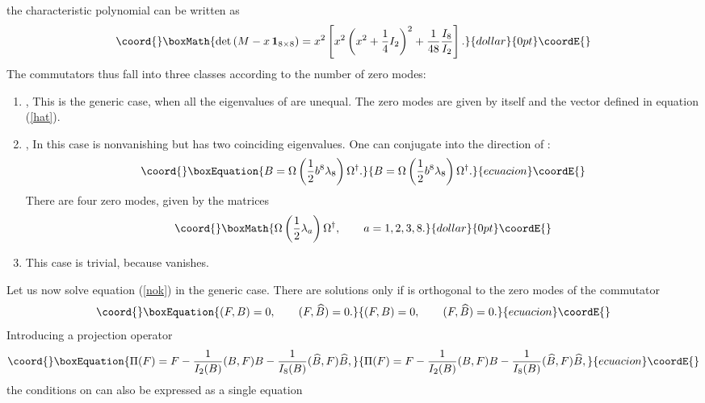 \documentclass[a4paper,12pt]{article}
\begin{document}
the characteristic polynomial can be written as 
$$\coord{}\boxMath{ \det \left( M - x \, {\bf 1}_{8 \times 8} \right) = x^2 \left[ x^2 \left( x^2 + \frac{1}{4} I_2 \right)^2  + 
 \frac{1}{48} \frac{I_8}{I_2} \right]. }{dollar}{0pt}\coordE{}$$
The commutators thus fall into three classes according to the number of zero modes:
\begin{enumerate}
\item
{}\coordHE{}, \coordHE{} \hfill \break
This is the generic case, when all the eigenvalues of \coordHE{} are unequal. The zero modes are given by \coordHE{} itself and the vector \coordHE{} defined in equation (\ref{hat}).
\item
{}\coordHE{}, \coordHE{} \hfill \break
In this case \coordHE{} is nonvanishing but has two coinciding eigenvalues. One can conjugate \coordHE{} into the direction of \coordHE{}:
\begin{equation}\coord{}\boxEquation{\label{bform}
B = \Omega \left( \frac{1}{2} b^8 \lambda_8 \right) \Omega^{\dagger}.
}{B = \Omega \left( \frac{1}{2} b^8 \lambda_8 \right) \Omega^{\dagger}.
}{ecuacion}\coordE{}\end{equation}
There are four zero modes, given by the matrices
$$\coord{}\boxMath{ \Omega \left( \frac{1}{2} \lambda_a \right)  \Omega^{\dagger}, \qquad a=1,2,3,8.}{dollar}{0pt}\coordE{}$$
\item
This case is trivial, because \coordHE{} vanishes.
\end{enumerate}
Let us now solve equation (\ref{nok}) in the generic case. There are solutions only if \coordHE{} is orthogonal to the zero modes of the commutator
\begin{equation}\coord{}\boxEquation{\label{cond}
(F,B)=0, \qquad (F,\widehat{B})=0.
}{(F,B)=0, \qquad (F,\widehat{B})=0.
}{ecuacion}\coordE{}\end{equation}
Introducing a projection operator
\begin{equation}\coord{}\boxEquation{\label{projo}
\Pi(F) = F - \frac{1}{I_2(B)} (B,F) B - \frac{1}{I_8(B)} (\widehat{B},F) \widehat{B},
}{\Pi(F) = F - \frac{1}{I_2(B)} (B,F) B - \frac{1}{I_8(B)} (\widehat{B},F) \widehat{B},
}{ecuacion}\coordE{}\end{equation}
the conditions on \coordHE{} can also be expressed as a single equation
\end{document}
